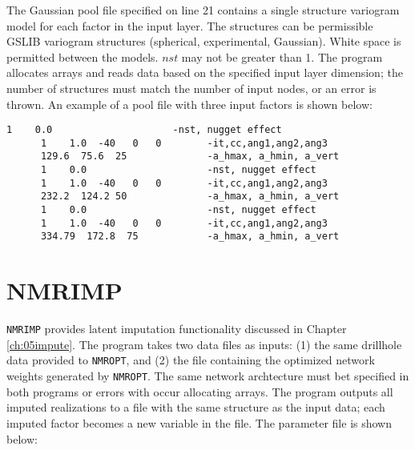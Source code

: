 The Gaussian pool file specified on line 21 contains a single structure variogram model for each factor in the input layer. The structures can be permissible GSLIB variogram structures (spherical, experimental, Gaussian).  White space is permitted between the models. $nst$ may not be greater than 1. The program allocates arrays and reads data based on the specified input layer dimension; the number of structures must match the number of input nodes, or an error is thrown. An example of a pool file with three input factors is shown below:

\begin{framed}
   \begin{lstlisting}[style=ccgParameterfile]
      1    0.0                     -nst, nugget effect
      1    1.0  -40   0   0        -it,cc,ang1,ang2,ang3
      129.6  75.6  25              -a_hmax, a_hmin, a_vert  
      1    0.0                     -nst, nugget effect
      1    1.0  -40   0   0        -it,cc,ang1,ang2,ang3
      232.2  124.2 50              -a_hmax, a_hmin, a_vert
      1    0.0                     -nst, nugget effect
      1    1.0  -40   0   0        -it,cc,ang1,ang2,ang3
      334.79  172.8  75            -a_hmax, a_hmin, a_vert  
   \end{lstlisting}
\end{framed}

\FloatBarrier
\section{NMRIMP}
\label{sect:Anmrimp}

\texttt{NMRIMP} provides latent imputation functionality discussed in Chapter \ref{ch:05impute}. The program takes two data files as inputs: (1) the same drillhole data provided to \texttt{NMROPT}, and (2) the file containing the optimized network weights generated by \texttt{NMROPT}. The same network archtecture must bet specified in both programs or errors with occur allocating arrays. The program outputs all imputed realizations to a file with the same structure as the input data; each imputed factor becomes a new variable in the file. The parameter file is shown below:

